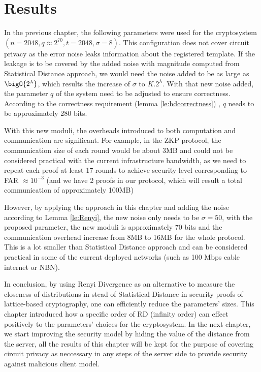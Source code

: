 \section{Results}
\label{sec:secProcResult}
In the previous chapter, the following parameters were used for the cryptosystem
$(n = 2048, q \approx 2^{70}, t = 2048, \sigma = 8)$. This configuration does
not cover circuit privacy as the error noise leaks information about the
registered template. If the leakage is to be covered by the added noise with
magnitude computed from Statistical Distance approach, we would need the noise
added to be as large as $\bigO{2^{\lambda}}$, which results the increase of
$\sigma$ to $K.2^{\lambda}$. With that new noise added, the parameter $q$ of the
system need to be adjusted to ensure correctness. According to the correctness
requirement (lemma \ref{le:hdcorrectness}) , $q$ needs to be approximately 280
bits.

With this new moduli, the overheads introduced to both computation and
communication are significant. For example, in the ZKP protocol, the
communication size of each round would be about 3MB and could not be considered
practical with the current infrastructure bandwidth, as we need to repeat each
proof at least 17 rounds to achieve security level corresponding to FAR $\approx 10^{-3}$ (and we have 2 proofs in our protocol, which will
result a total communication of approximately 100MB)

However, by applying the approach in this chapter and adding the noise according
to Lemma \ref{le:Renyi}, the new noise only needs to be $\sigma = 50$, with the
proposed parameter, the new moduli is approximately 70 bits and the
communication overhead increase from 8MB to 16MB for the whole protocol. This is
a lot smaller than Statistical Distance approach and can be considered practical
in some of the current deployed networks (such as 100 Mbps cable internet or
NBN).

In conclusion, by using Renyi Divergence as an alternative to measure the
closeness of distributions in stead of Statistical Distance in security proofs
of lattice-based cryptography, one can efficiently reduce the parameters'
sizes. This chapter introduced how a specific order of RD (infinity order) can
effect positively to the parameters' choices for the cryptosystem. In the next
chapter, we start improving the security model by hiding the value of the
distance from the server, all the results of this chapter will be kept for the
purpose of covering circuit privacy as neccessary in any steps of the server
side to provide security against malicious client model.


    
